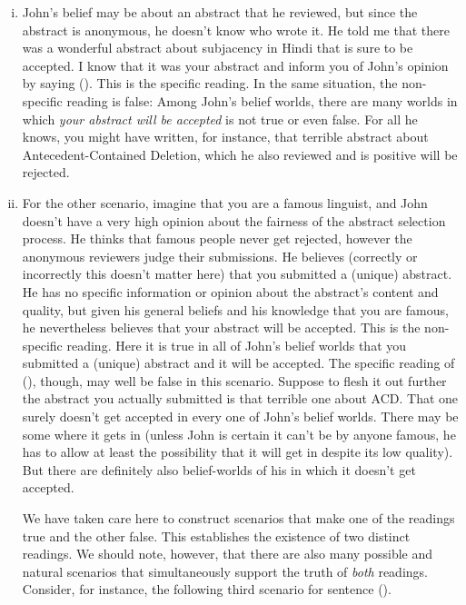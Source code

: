 \begin{enumerate}[(i)]
	
\item John's belief may be about an abstract that he reviewed, but since the
  abstract is anonymous, he doesn't know who wrote it. He told me that there was
  a wonderful abstract about subjacency in Hindi that is sure to be accepted. I
  know that it was your abstract and inform you of John's opinion by saying
  (\lastx). This is the specific reading. In the same situation, the non-specific
  reading is false: Among John's belief worlds, there are many worlds in which
  \emph{your abstract will be accepted} is not true or even false. For all he
  knows, you might have written, for instance, that terrible abstract about
  Antecedent-Contained Deletion, which he also reviewed and is positive will be
  rejected.
	
\item For the other scenario, imagine that you are a famous linguist, and John
  doesn't have a very high opinion about the fairness of the abstract selection
  process. He thinks that famous people never get rejected, however the
  anonymous reviewers judge their submissions. He believes (correctly or
  incorrectly \dash this doesn't matter here) that you submitted a (unique)
  abstract. He has no specific information or opinion about the abstract's
  content and quality, but given his general beliefs and his knowledge that you
  are famous, he nevertheless believes that your abstract will be accepted. This
  is the non-specific reading. Here it is true in all of John's belief worlds
  that you submitted a (unique) abstract and it will be accepted. The specific
  reading of (\lastx), though, may well be false in this scenario. Suppose \dash to
  flesh it out further \dash the abstract you actually submitted is that terrible
  one about ACD. That one surely doesn't get accepted in every one of John's
  belief worlds. There may be some where it gets in (unless John is certain it
  can't be by anyone famous, he has to allow at least the possibility that it
  will get in despite its low quality). But there are definitely also
  belief-worlds of his in which it doesn't get accepted.
	
	We have taken care here to construct scenarios that make one of the readings
  true and the other false. This establishes the existence of two distinct
  readings. We should note, however, that there are also many possible and
  natural scenarios that simultaneously support the truth of \emph{both}
  readings. Consider, for instance, the following third scenario for sentence
  (\lastx).
	

\end{enumerate}
